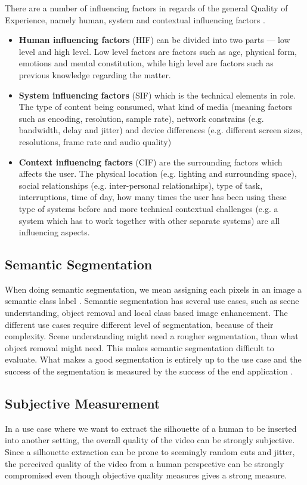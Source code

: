 There are a number of influencing factors in regards of the general Quality of Experience, namely human, system and contextual influencing factors \cite{factors_QoE}.
\begin{itemize}
    \item \textbf{Human influencing factors} (HIF) can be divided into two parts — low level and high level. Low level factors are factors such as age, physical form, emotions and mental constitution, while high level are factors such as previous knowledge regarding the matter. 
    \item \textbf{System influencing factors} (SIF) which is the technical elements in role. The type of content being consumed, what kind of media (meaning factors such as encoding, resolution, sample rate), network constrains (e.g. bandwidth, delay and jitter) and device differences (e.g. different screen sizes, resolutions, frame rate and audio quality)
    \item \textbf{Context influencing factors} (CIF) are the surrounding factors which affects the user. The physical location (e.g. lighting and surrounding space), social relationships (e.g. inter-personal relationships), type of task, interruptions, time of day, how many times the user has been using these type of systems before and more technical contextual challenges (e.g. a system which has to work together with other separate systems) are all influencing aspects.
\end{itemize}

\subsection{Semantic Segmentation}
When doing semantic segmentation, we mean assigning each pixels in an image a semantic class label \cite{csurka2013good}. Semantic segmentation has several use cases, such as scene understanding, object removal and local class based image enhancement. The different use cases require different level of segmentation, because of their complexity. Scene understanding might need a rougher segmentation, than what object removal might need. This makes semantic segmentation difficult to evaluate. What makes a good segmentation is entirely up to the use case and the success of the segmentation is measured by the success of the end application \cite{csurka2013good}.


\subsection{Subjective Measurement}
\label{sec:measurement}
In a use case where we want to extract the silhouette of a human to be inserted into another setting, the overall quality of the video can be strongly subjective. Since a silhouette extraction can be prone to seemingly random cuts and jitter, the perceived quality of the video from a human perspective can be strongly compromised even though objective quality measures gives a strong measure. 

